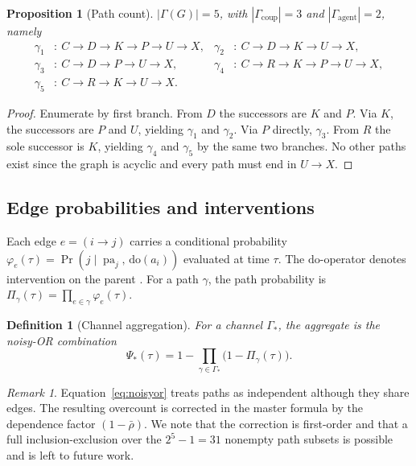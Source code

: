 \documentclass[11pt]{article}
\newtheorem{definition}{Definition}[section]
\newtheorem{proposition}{Proposition}[section]
\theoremstyle{remark}
\newtheorem{remark}{Remark}[section]
\DeclareMathOperator{\pa}{pa}
\newcommand{\rhobar}{\bar{\rho}}
\begin{document}
\begin{proposition}[Path count]\label{prop:paths}
$|\Gamma(G)|=5$, with $|\Gamma_{\mathrm{coup}}|=3$ and $|\Gamma_{\mathrm{agent}}|=2$, namely
\begin{align*}
\gamma_1&:\ C\to D\to K\to P\to U\to X, &
\gamma_2&:\ C\to D\to K\to U\to X,\\
\gamma_3&:\ C\to D\to P\to U\to X, &
\gamma_4&:\ C\to R\to K\to P\to U\to X,\\
\gamma_5&:\ C\to R\to K\to U\to X.
\end{align*}
\end{proposition}
\begin{proof}
Enumerate by first branch. From $D$ the successors are $K$ and $P$. Via $K$, the successors are $P$ and $U$, yielding $\gamma_1$ and $\gamma_2$. Via $P$ directly, $\gamma_3$. From $R$ the sole successor is $K$, yielding $\gamma_4$ and $\gamma_5$ by the same two branches. No other paths exist since the graph is acyclic and every path must end in $U\to X$. \qedhere
\end{proof}

\subsection{Edge probabilities and interventions}

Each edge $e=(i\to j)$ carries a conditional probability $\varphi_e(\tau)=\Pr(j\mid \pa_j,\,\mathrm{do}(a_i))$ evaluated at time $\tau$. The $\mathrm{do}$-operator denotes intervention on the parent \cite{pearl2009}. For a path $\gamma$, the path probability is $\Pi_\gamma(\tau)=\prod_{e\in\gamma}\varphi_e(\tau)$.

\begin{definition}[Channel aggregation]\label{def:agg}
For a channel $\Gamma_\ast$, the aggregate is the noisy-OR combination
\begin{equation}\label{eq:noisyor}
\Psi_\ast(\tau)=1-\prod_{\gamma\in\Gamma_\ast}\bigl(1-\Pi_\gamma(\tau)\bigr).
\end{equation}
\end{definition}

\begin{remark}
Equation~\eqref{eq:noisyor} treats paths as independent although they share edges. The resulting overcount is corrected in the master formula by the dependence factor $(1-\rhobar)$. We note that the correction is first-order and that a full inclusion-exclusion over the $2^5-1=31$ nonempty path subsets is possible and is left to future work.
\end{remark}
\end{document}
